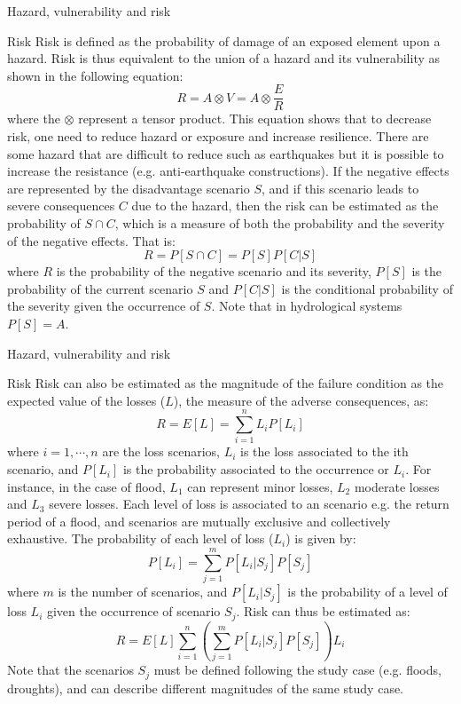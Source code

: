 \documentclass[8pt]{beamer}
\renewcommand{\emph}[1]{\textcolor{myorange}{#1}}
\begin{document}
\begin{frame}{Hazard, vulnerability and risk}
    \begin{block}{Risk}
        \alert{Risk} is defined as the probability of damage of an exposed element upon a hazard. Risk is thus equivalent to the union of a hazard and its vulnerability as shown in the following equation:
        \[ 
            R = A\otimes V = A \otimes \frac{E}{R}
        \]
        where the $\otimes$ represent a \emph{tensor product}. This equation shows that to decrease risk, one need to reduce hazard or exposure and increase resilience.  There are some hazard that are difficult to reduce such as earthquakes but it is possible to increase the resistance (e.g. anti-earthquake constructions). If the negative effects are represented by the disadvantage scenario $S$, and if this scenario leads to severe consequences $C$ due to the hazard, then the risk can be estimated as the probability of $S\cap C$, which is a measure of both the probability and the severity of the negative effects. That is:
        \[
            R = P[S\cap C] = P[S] P[C|S] 
        \]
        where $R$ is the probability of the negative scenario and its severity, $P[S]$ is the probability of the current scenario $S$ and $P[C|S]$ is the conditional probability of the severity given the occurrence of $S$. Note that in hydrological systems $P[S] = A$. 
    \end{block}

\end{frame}

\begin{frame}{Hazard, vulnerability and risk}
    \begin{block}{Risk}
       Risk can also be estimated as the magnitude of the failure condition as the expected value of the losses ($L$), the measure of the adverse consequences, as:
        \[
            R = E[L] = \sum_{i=1}^n L_i P[L_i]
        \]
        where $i=1,\cdots, n$ are the loss scenarios, $L_i$ is the loss associated to the ith scenario, and $P[L_i]$ is the probability associated to the occurrence or $L_i$. For instance, in the case of flood, $L_1$ can represent  minor losses, $L_2$  moderate losses and $L_3$  severe losses. Each level of loss is associated to an scenario e.g. the return period of a flood, and scenarios are mutually exclusive and collectively exhaustive. The probability of each level of loss ($L_i$) is given by:
        \vspace{-5pt}
        \[
            P[L_i] = \sum_{j=1}^{m} P[L_i | S_j] P[S_j]
        \]
        where $m$ is the number of scenarios, and $P[L_i | S_j]$ is the probability of a level of loss $L_i$ given the occurrence of scenario $S_j$. Risk can thus be estimated as:
        \vspace{-5pt}
        \[
            R = E[L] \sum_{i=1}^n \left( \sum_{j=1}^m P[L_i | S_j] P[S_j] \right) L_i 
        \] 
        Note that the scenarios $S_j$ must be defined following the study case (e.g. floods, droughts), and can describe different magnitudes of the same study case. 

    \end{block}

\end{frame}
\end{document}
